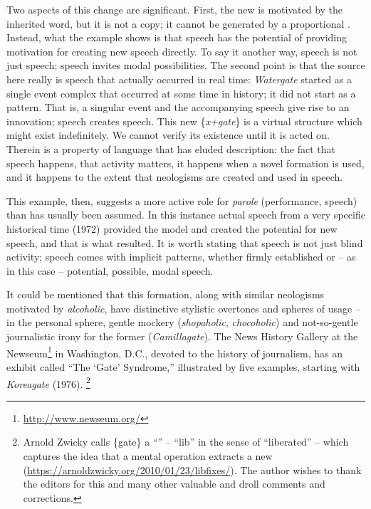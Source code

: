 \documentclass[output=paper,
modfonts
]{LSP/langsci}
\begin{document}
Two aspects of this change are significant. First, the new  is
motivated by the inherited word, but it is not a copy; it cannot be
generated by a proportional . Instead, what the example shows is
that speech has the potential of providing motivation for creating new
speech directly. To say it another way, speech is not just speech;
speech invites modal possibilities. The second point is that the source
here really is speech that actually occurred in real time:
\emph{Watergate} started as a single event complex that occurred at some
time in history; it did not start as a pattern. That is, a singular
event and the accompanying speech give rise to an innovation; speech
creates speech. This new \{\emph{x+gate}\} is a virtual structure which
might exist indefinitely. We cannot verify its existence until it is
acted on. Therein is a property of language that has eluded description:
the fact that speech happens, that activity matters, it happens when a
novel formation is used, and it happens to the extent that neologisms
are created and used in speech.

This example, then, suggests a more active role for \emph{parole}
(performance, speech) than has usually been assumed. In this instance
actual speech from a very specific historical time (1972) provided the
model and created the potential for new speech, and that is what
resulted. It is worth stating that speech is not just blind activity;
speech comes with implicit patterns, whether firmly established or -- as
in this case -- potential, possible, modal speech.

It could be mentioned that this formation, along with similar neologisms
motivated by \emph{alcoholic}, have distinctive stylistic overtones and
spheres of usage -- in the personal sphere, gentle mockery
(\emph{shopaholic}, \emph{chocoholic}) and not-so-gentle journalistic
irony for the former (\emph{Camillagate}). The News History Gallery at
the Newseum\footnote{\url{http://www.newseum.org/}} in Washington, D.C., devoted
to the history of journalism, has an exhibit called ``The `Gate'
Syndrome,'' illustrated by five examples, starting with \emph{Koreagate}
(1976). \footnote{
  Arnold Zwicky calls \{gate\} a ``'' -- ``lib'' in the sense of
  ``liberated'' -- which captures the idea that a mental operation
  extracts a new 
  (\url{https://arnoldzwicky.org/2010/01/23/libfixes/}). The author
  wishes to thank the editors for this and many other valuable and droll
  comments and corrections.}
\end{document}
